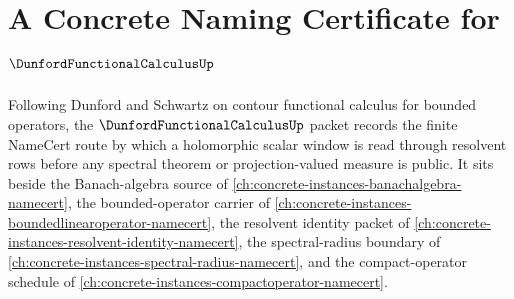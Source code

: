 \chapter{A Concrete Naming Certificate for $\DunfordFunctionalCalculusUp$}
\label{ch:concrete-instances-dunford-functional-calculus-namecert}

Following Dunford and Schwartz on contour functional calculus for bounded operators, the $\DunfordFunctionalCalculusUp$ packet records the finite NameCert route by which a holomorphic scalar window is read through resolvent rows before any spectral theorem or projection-valued measure is public. It sits beside the Banach-algebra source of \autoref{ch:concrete-instances-banachalgebra-namecert}, the bounded-operator carrier of \autoref{ch:concrete-instances-boundedlinearoperator-namecert}, the resolvent identity packet of \autoref{ch:concrete-instances-resolvent-identity-namecert}, the spectral-radius boundary of \autoref{ch:concrete-instances-spectral-radius-namecert}, and the compact-operator schedule of \autoref{ch:concrete-instances-compactoperator-namecert}.

